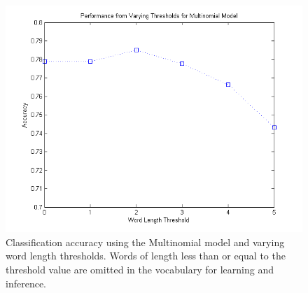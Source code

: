 \documentclass[12pt]{article}
\begin{document}
\begin{figure}[!t]
  \centering
  \includegraphics[scale=.50]{img/vocabthreshold_multi.png}
  \caption{Classification accuracy using the Multinomial model and varying word length thresholds. Words of length less than or equal to the threshold value are omitted in the vocabulary for learning and inference.}
  \label{fig:vocabthreshold_multi}
\end{figure}
\end{document}
